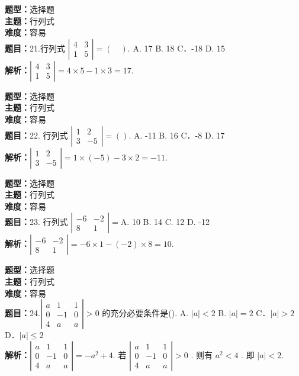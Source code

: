 \documentclass{ctexart}
\newenvironment{question}[5]{%
	\noindent\textbf{题型：}#1\\
	\textbf{主题：}#2\\
	\textbf{难度：}#3\\
	\textbf{题目：}#4\\
	\textbf{解析：}#5\\
	\vspace{1em}
}{}
\begin{document}
\begin{question}
	{选择题}
	{行列式}
	{容易}
	{21.行列式 $\left|\begin{array}{ll}4 & 3 \\ 1 & 5\end{array}\right|=(\quad). $ A.  17 \quad B.  18 \quad C．-18 \quad D.  15}
	{$\left|\begin{array}{ll}4 & 3 \\ 1 & 5\end{array}\right|=4 \times 5-1 \times 3=17. $}
\end{question}


\begin{question}
	{选择题}
	{行列式}
	{容易}
	{22. 行列式 $\left|\begin{array}{cc}1 & 2 \\ 3 & -5\end{array}\right|=().$ A. -11 B.  16 C．-8 D.  17}
	{$\left|\begin{array}{cc}1 & 2 \\ 3 & -5\end{array}\right|=1 \times(-5)-3 \times 2=-11.$}
\end{question}

\begin{question}
	{选择题}
	{行列式}
	{容易}
	{23. 行列式 $\left|\begin{array}{cc}-6 & -2 \\ 8 & 1\end{array}\right|=$A.  10 B.  14 C.  12 D. -12}
	{$\left|\begin{array}{cc}-6 & -2 \\ 8 & 1\end{array}\right|=-6 \times 1-(-2) \times 8=10. $}
\end{question}

\begin{question}
	{选择题}
	{行列式}
	{容易}
	{24.$\left|\begin{array}{ccc}a & 1 & 1 \\ 0 & -1 & 0 \\ 4 & a & a\end{array}\right|>0$ 的充分必要条件是(\quad).  A. $|a|<2$ B. $|a|=2$ C．$|a|>2$ D．$|a| \leq 2$}
	{$\left|\begin{array}{ccc}a & 1 & 1 \\ 0 & -1 & 0 \\ 4 & a & a\end{array}\right|=-a^2+4. $ 若 $\left|\begin{array}{ccc}a & 1 & 1 \\ 0 & -1 & 0 \\ 4 & a & a\end{array}\right|>0$ . 则有 $a^2<4$ . 即 $|a|<2.$}
\end{question}
\end{document}
